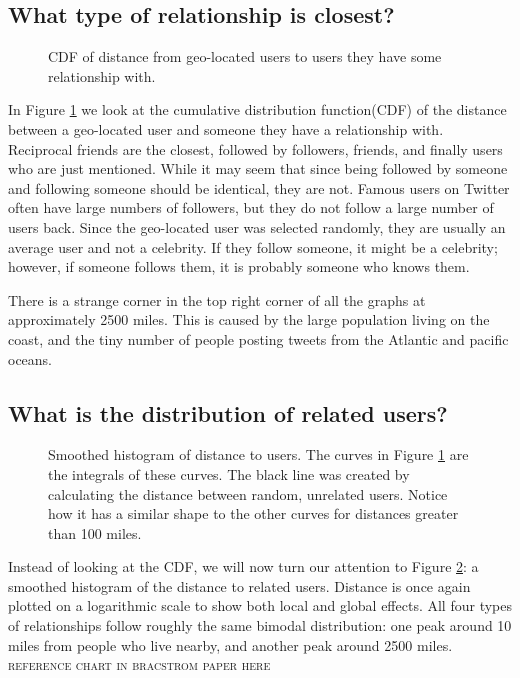 \documentclass{sig-alternate}
\begin{document}
\subsection{What type of relationship is closest?}
\begin{figure}
\centering
{}
\caption{
CDF of distance from geo-located users to users they have some relationship
with.
}
\label{fig:EdgeTypesCum}
\end{figure}
In Figure \ref{fig:EdgeTypesCum} we look at the cumulative distribution function(CDF) of the distance between a geo-located user and someone they have a relationship with.
Reciprocal friends are the closest, followed by followers, friends, and finally users who are just mentioned.
While it may seem that since being followed by someone and following someone should be identical, they are not.
Famous users on Twitter often have large numbers of followers, but they do not follow a large number of users back.
Since the geo-located user was selected randomly, they are usually an average user and not a celebrity.
If they follow someone, it might be a celebrity; however, if someone follows them, it is probably someone who knows them.

There is a strange corner in the top right corner of all the graphs at approximately 2500 miles. This is caused by the large population living on the coast, and the tiny number of people posting tweets from the Atlantic and pacific oceans.

\subsection{What is the distribution of related users?}
\begin{figure}
\centering
{}
\caption{
Smoothed histogram of distance to users.  The curves in Figure
\ref{fig:EdgeTypesCum} are the integrals of these curves. The black line was created by calculating the distance between random, unrelated users. Notice how it has a similar shape to the other curves for distances greater than 100 miles.
}
\label{fig:EdgeTypes}
\end{figure}
Instead of looking at the CDF, we will now turn our attention to Figure
\ref{fig:EdgeTypes}: a smoothed histogram of the distance to related users.
Distance is once again plotted on a logarithmic scale to show both local and
global effects.
All four types of relationships follow roughly the same bimodal distribution:
one peak around 10 miles from people who live nearby, and another peak around
2500 miles.
\textsc{reference chart in bracstrom paper here}
\end{document}
